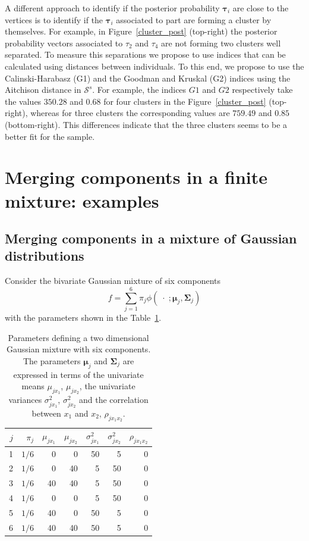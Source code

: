 \documentclass[submit]{smj}
\theoremstyle{definition}
\newcommand{\m}[1]{\boldsymbol{#1}}
\begin{document}
A different approach to identify if the posterior probability $\m\tau_{i}$ are close to the vertices is to identify if the $\m\tau_{i}$ associated to part are forming a cluster by themselves. For example, in Figure~\ref{cluster_post} (top-right) the posterior probability vectors associated to $\tau_2$ and $\tau_4$ are not forming two clusters well separated. To measure this separations we propose to use indices that can be calculated using distances between individuals. To this end, we propose to use the Calinski-Harabasz (G1) and the Goodman and Kruskal (G2) indices \citep{milligan1985} using the Aitchison distance in $\mathcal{S}^s$. For example, the indices $G1$ and $G2$ respectively take the values $350.28$ and $0.68$ for four clusters in the Figure~\ref{cluster_post} (top-right), whereas for three clusters the corresponding values are $759.49$ and $0.85$ (bottom-right). This differences indicate that the three clusters seems to be a better fit for the sample.

\section{Merging components in a finite mixture: examples}\label{merging_examples_dist}

\subsection{Merging components in a mixture of Gaussian distributions}

Consider the bivariate Gaussian mixture of six components \citep{baudry2010combining}
\[
f= \sum_{j=1}^6 \pi_j \phi(\;\cdot\; ;  \m\mu_j, \m\Sigma_j)
\]
with the parameters shown in the Table~\ref{pars_table}. 

\begin{table}[htpb]
\centering
\begin{tabular}{rrrrrrr}
  \hline
$j$ & $\pi_j$ & $\mu_{j x_1}$ & $\mu_{j x_2}$ & $\sigma^2_{j x_1}$ & $\sigma^2_{j x_2}$ & $\rho_{j x_1 x_2}$ \\ 
  \hline
  1 &  $1/6$ &     0 &     0 &    50 &     5 &     0 \\ 
  2 &  $1/6$  &     0 &    40 &     5 &    50 &     0 \\ 
  3 &  $1/6$  &    40 &    40 &     5 &    50 &     0 \\ 
  4 &  $1/6$  &     0 &     0 &     5 &    50 &     0 \\ 
  5 &  $1/6$  &    40 &     0 &    50 &     5 &     0 \\ 
  6 &  $1/6$  &    40 &    40 &    50 &     5 &     0 \\ 
   \hline
\end{tabular}
\caption{Parameters defining a two dimensional Gaussian mixture with six components. The parameters $\m\mu_j$ and $\m\Sigma_j$ are expressed in terms of the univariate means $\mu_{j x_1}$, $\mu_{j x_2}$, the univariate variances $\sigma^2_{j x_1}$, $\sigma^2_{j x_2}$ and the correlation between $x_1$ and $x_2$, $\rho_{j x_1 x_2}$.}
\label{pars_table}
\end{table}
\end{document}
